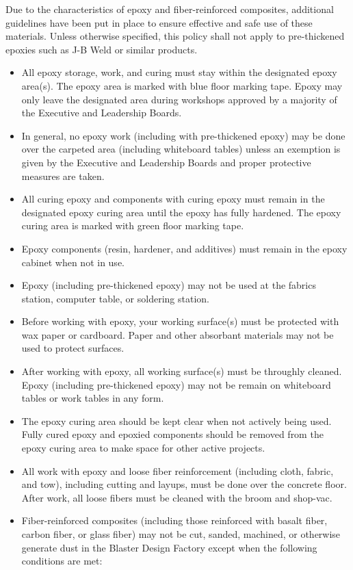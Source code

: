 \documentclass[12pt,letterpaper]{article}
\begin{document}
Due to the characteristics of epoxy and fiber-reinforced composites, additional guidelines have been put in place to ensure effective and safe use of these materials. Unless otherwise specified, this policy shall not apply to pre-thickened epoxies such as J-B Weld or similar products.
\begin{itemize}
    \item All epoxy storage, work, and curing must stay within the designated epoxy area(s). The epoxy area is marked with blue floor marking tape. Epoxy may only leave the designated area during workshops approved by a majority of the Executive and Leadership Boards.
    \item In general, no epoxy work (including with pre-thickened epoxy) may be done over the carpeted area (including whiteboard tables) unless an exemption is given by the Executive and Leadership Boards and proper protective measures are taken.
    \item All curing epoxy and components with curing epoxy must remain in the designated epoxy curing area until the epoxy has fully hardened. The epoxy curing area is marked with green floor marking tape.
    \item Epoxy components (resin, hardener, and additives) must remain in the epoxy cabinet when not in use.
    \item Epoxy (including pre-thickened epoxy) may not be used at the fabrics station, computer table, or soldering station.
    \item Before working with epoxy, your working surface(s) must be protected with wax paper or cardboard. Paper and other absorbant materials may not be used to protect surfaces.
    \item After working with epoxy, all working surface(s) must be throughly cleaned. Epoxy (including pre-thickened epoxy) may not be remain on whiteboard tables or work tables in any form.
    \item The epoxy curing area should be kept clear when not actively being used. Fully cured epoxy and epoxied components should be removed from the epoxy curing area to make space for other active projects. 
    \item All work with epoxy and loose fiber reinforcement (including cloth, fabric, and tow), including cutting and layups, must be done over the concrete floor. After work, all loose fibers must be cleaned with the broom and shop-vac. 
    \item Fiber-reinforced composites (including those reinforced with basalt fiber, carbon fiber, or glass fiber) may not be cut, sanded, machined, or otherwise generate dust in the Blaster Design Factory except when the following conditions are met:

\end{itemize}
\end{document}
